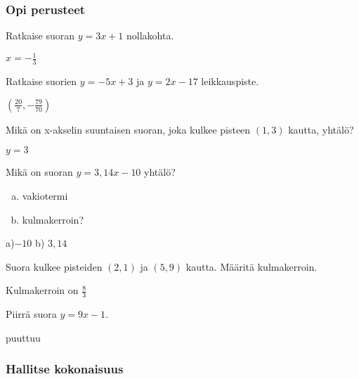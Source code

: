\begin{tehtavasivu}

\subsubsection*{Opi perusteet}

\begin{tehtava}
Ratkaise suoran $y=3x+1$ nollakohta.
\begin{vastaus}
$x=-\frac{1}{3}$
\end{vastaus}
\end{tehtava}

\begin{tehtava}
Ratkaise suorien $y=-5x+3$ ja $y=2x-17$ leikkauspiste.
\begin{vastaus}
$(\frac{20}{7}, -\frac{79}{70})$
\end{vastaus}
\end{tehtava}

\begin{tehtava}
Mikä on x-akselin suuntaisen suoran, joka kulkee pisteen $(1, 3)$ kautta, yhtälö?
\begin{vastaus}
$y=3$
\end{vastaus}
\end{tehtava}

\begin{tehtava}
Mikä on suoran $y=3,14x-10$ yhtälö?
\begin{enumerate}[a)]
\item vakiotermi
\item kulmakerroin?
\end{enumerate}
\begin{vastaus}
a)$-10$ b) $3,14$
\end{vastaus}
\end{tehtava}

\begin{tehtava}
Suora kulkee pisteiden $(2, 1)$ ja $(5, 9)$ kautta. Määritä kulmakerroin.
\begin{vastaus}
Kulmakerroin on $\frac{8}{3}$
\end{vastaus}
\end{tehtava}

\begin{tehtava}
Piirrä suora $y=9x-1$.
\begin{vastaus}
puuttuu
\end{vastaus}
\end{tehtava}

\subsubsection*{Hallitse kokonaisuus}


\end{tehtavasivu}
